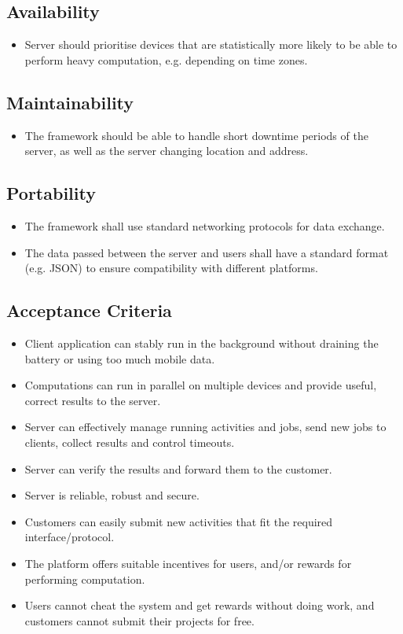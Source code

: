 \documentclass[a4paper,10pt]{article}
\begin{document}
\subsection{Availability}

\begin{itemize}
	\item Server should prioritise devices that are statistically more likely to be able to perform heavy computation, e.g. depending on time zones.

\end{itemize} 

\subsection{Maintainability}

\begin{itemize}
	\item The framework should be able to handle short downtime periods of the server, as well as the server changing location and address.

\end{itemize} 

\subsection{Portability}

\begin{itemize}
	\item The framework shall use standard networking protocols for data exchange.
	\item The data passed between the server and users shall have a standard format (e.g. JSON) to ensure compatibility with different platforms.
\end{itemize} 

\subsection{Acceptance Criteria}

\begin{itemize}
	\item Client application can stably run in the background without draining the battery or using too much mobile data.
	\item Computations can run in parallel on multiple devices and provide useful, correct results to the server.
	\item Server can effectively manage running activities and jobs, send new jobs to clients, collect results and control timeouts.
	\item Server can verify the results and forward them to the customer.
	\item Server is reliable, robust and secure.
	\item Customers can easily submit new activities that fit the required interface/protocol.
	\item The platform offers suitable incentives for users, and/or rewards for performing computation.
	\item Users cannot cheat the system and get rewards without doing work, and customers cannot submit their projects for free.
\end{itemize}
\end{document}
